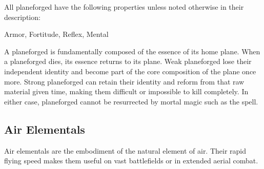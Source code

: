         All planeforged have the following properties unless noted otherwise in their description:
        
    
     Armor,
     Fortitude,
     Reflex,
     Mental
  
     A planeforged is fundamentally composed of the essence of its home plane.
    When a planeforged dies, its essence returns to its plane.
    Weak planeforged lose their independent identity and become part of the core composition of the plane once more.
    Strong planeforged can retain their identity and reform from that raw material given time, making them difficult or impossible to kill completely.
    In either case, planeforged cannot be resurrected by mortal magic such as the  spell.
  
      
    \subsection{Air Elementals}
      
      Air elementals are the embodiment of the natural element of air.
      Their rapid flying speed makes them useful on vast battlefields or in extended aerial combat.
    

